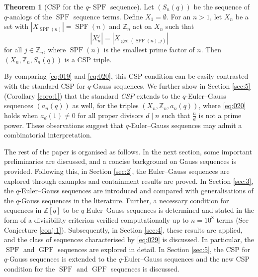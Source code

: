 \documentclass{article}
\numberwithin{equation}{section}
\theoremstyle{definition}
\newtheorem*{theorem*}{Theorem}
\begin{document}
\begin{theorem*}[CSP for the $q$-$\operatorname{SPF}$ sequence]
    Let $(S_n(q))$ be the sequence of $q$-analogs of the $\operatorname{SPF}$ sequence terms. Define $X_{1}=\emptyset$. For an $n>1$, let $X_{n}$ be a set with $|X_{\operatorname{SPF}(n)}|=\operatorname{SPF}(n)$ and $\mathbb{Z}_n$ act on $X_n$ such that  
    \begin{equation}\label{eq:019}        |X_n^j|=\left|X_{\gcd{(\operatorname{SPF}(n), j)}}\right|
    \end{equation} 
     for all $j\in\mathbb{Z}_n$, where $\operatorname{SPF}(n)$ is the smallest prime factor of $n$. 
     Then $\left(X_n,\mathbb{Z}_n,S_n(q)\right)$ is a CSP triple.  
\end{theorem*}

By comparing \eqref{eq:019} and \eqref{eq:020}, this CSP condition can be easily contrasted with the standard CSP for $q$-Gauss sequences. We further show in Section \ref{sec:5} (Corollary \ref{coro:1}) that the standard \emph{CSP} extends to the $q$-Euler--Gauss sequences $(a_{n}(q))$ as well, for the triples $(X_{n}, \mathbb{Z}_{n}, a_{n}(q))$, where \eqref{eq:020} holds when $a_d(1)\neq0$ for all proper divisors $d\mid n$ such that $\frac{n}{d}$ is not a prime power. These observations suggest that $q$-Euler--Gauss sequences may admit a combinatorial interpretation.  

The rest of the paper is organised as follows. In the next section, some important preliminaries are discussed, and a concise background on Gauss sequences is provided. Following this, in Section \ref{sec:2}, the Euler--Gauss sequences are explored through examples and containment results are proved. In Section \ref{sec:3}, the $q$-Euler--Gauss sequences are introduced and compared with generalisations of the $q$-Gauss sequences in the literature. Further, a necessary condition for sequences in $\mathbb{Z}[q]$ to be $q$-Euler--Gauss sequences is determined and stated in the form of a divisibility criterion verified computationally up to $n=10^8$ terms (See Conjecture \ref{conj:1}). Subsequently, in Section \ref{sec:4}, these results are applied, and the class of sequences characterised by \eqref{eq:029} is discussed. In particular, the $\operatorname{SPF}$ and $\operatorname{GPF}$ sequences are explored in detail. In Section \ref{sec:5}, the CSP for $q$-Gauss sequences is extended to the $q$-Euler--Gauss sequences and the new CSP condition for the $\operatorname{SPF}$ and $\operatorname{GPF}$ sequences is discussed. 
 
\end{document}
